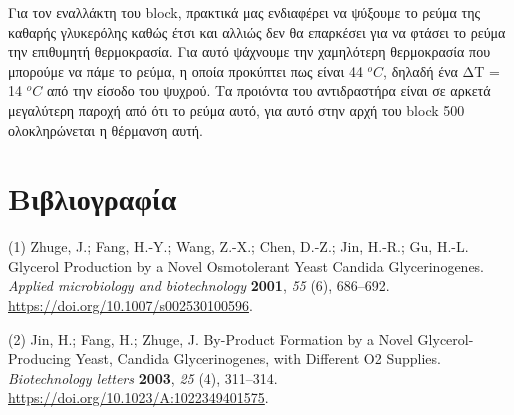 \documentclass[11pt]{article}
\begin{document}
Για τον εναλλάκτη του block, πρακτικά μας ενδιαφέρει να ψύξουμε το ρεύμα της καθαρής γλυκερόλης καθώς έτσι και αλλιώς δεν θα επαρκέσει για να φτάσει το ρεύμα την επιθυμητή θερμοκρασία. Για αυτό ψάχνουμε την χαμηλότερη θερμοκρασία που μπορούμε να πάμε το ρεύμα, η οποία προκύπτει πως είναι 44 \(^oC\), δηλαδή ένα ΔΤ = 14 \(^oC\) από την είσοδο του ψυχρού. Τα προιόντα του αντιδραστήρα είναι σε αρκετά μεγαλύτερη παροχή από ότι το ρεύμα αυτό, για αυτό στην αρχή του block 500 ολοκληρώνεται η θέρμανση αυτή.

\section{Βιβλιογραφία}
\label{sec:org6cefe02}
\hypertarget{citeproc_bib_item_1}{(1) Zhuge, J.; Fang, H.-Y.; Wang, Z.-X.; Chen, D.-Z.; Jin, H.-R.; Gu, H.-L. Glycerol Production by a Novel Osmotolerant Yeast Candida Glycerinogenes. \textit{Applied microbiology and biotechnology} \textbf{2001}, \textit{55} (6), 686–692. \url{https://doi.org/10.1007/s002530100596}.}

\hypertarget{citeproc_bib_item_2}{(2) Jin, H.; Fang, H.; Zhuge, J. By-Product Formation by a Novel Glycerol-Producing Yeast, Candida Glycerinogenes, with Different O2 Supplies. \textit{Biotechnology letters} \textbf{2003}, \textit{25} (4), 311–314. \url{https://doi.org/10.1023/A:1022349401575}.}
\end{document}

